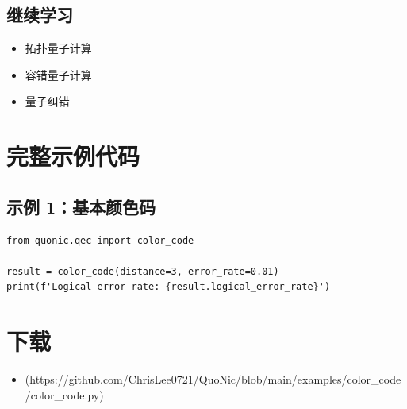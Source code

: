 \documentclass[12pt,a4paper]{article}
\begin{document}
\subsection{继续学习}
\begin{itemize}
  \item 拓扑量子计算
  \item 容错量子计算
  \item 量子纠错
\end{itemize}

\section{完整示例代码}

\subsection{示例 1：基本颜色码}

\begin{verbatim}
from quonic.qec import color_code

result = color_code(distance=3, error_rate=0.01)
print(f'Logical error rate: {result.logical_error_rate}')
\end{verbatim}

\section{下载}

\begin{itemize}
  \item [color\_code.py](https://github.com/ChrisLee0721/QuoNic/blob/main/examples/color_code/color_code.py)
\end{itemize}
\end{document}
